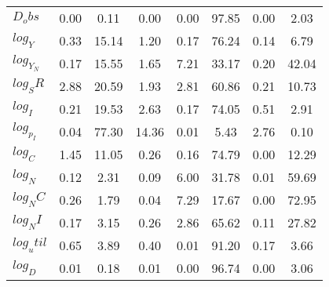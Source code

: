 \begin{center}
\begin{longtable}{lccccccc}
$D_obs     $	 & 	        0.00	 & 	        0.11	 & 	        0.00	 & 	        0.00	 & 	       97.85	 & 	        0.00	 & 	        2.03 \\ 
$log_Y     $	 & 	        0.33	 & 	       15.14	 & 	        1.20	 & 	        0.17	 & 	       76.24	 & 	        0.14	 & 	        6.79 \\ 
$log_Y_N   $	 & 	        0.17	 & 	       15.55	 & 	        1.65	 & 	        7.21	 & 	       33.17	 & 	        0.20	 & 	       42.04 \\ 
$log_SR    $	 & 	        2.88	 & 	       20.59	 & 	        1.93	 & 	        2.81	 & 	       60.86	 & 	        0.21	 & 	       10.73 \\ 
$log_I     $	 & 	        0.21	 & 	       19.53	 & 	        2.63	 & 	        0.17	 & 	       74.05	 & 	        0.51	 & 	        2.91 \\ 
$log_p_I   $	 & 	        0.04	 & 	       77.30	 & 	       14.36	 & 	        0.01	 & 	        5.43	 & 	        2.76	 & 	        0.10 \\ 
$log_C     $	 & 	        1.45	 & 	       11.05	 & 	        0.26	 & 	        0.16	 & 	       74.79	 & 	        0.00	 & 	       12.29 \\ 
$log_N     $	 & 	        0.12	 & 	        2.31	 & 	        0.09	 & 	        6.00	 & 	       31.78	 & 	        0.01	 & 	       59.69 \\ 
$log_NC    $	 & 	        0.26	 & 	        1.79	 & 	        0.04	 & 	        7.29	 & 	       17.67	 & 	        0.00	 & 	       72.95 \\ 
$log_NI    $	 & 	        0.17	 & 	        3.15	 & 	        0.26	 & 	        2.86	 & 	       65.62	 & 	        0.11	 & 	       27.82 \\ 
$log_util  $	 & 	        0.65	 & 	        3.89	 & 	        0.40	 & 	        0.01	 & 	       91.20	 & 	        0.17	 & 	        3.66 \\ 
$log_D     $	 & 	        0.01	 & 	        0.18	 & 	        0.01	 & 	        0.00	 & 	       96.74	 & 	        0.00	 & 	        3.06 \\ 
\end{longtable}
 \end{center}

